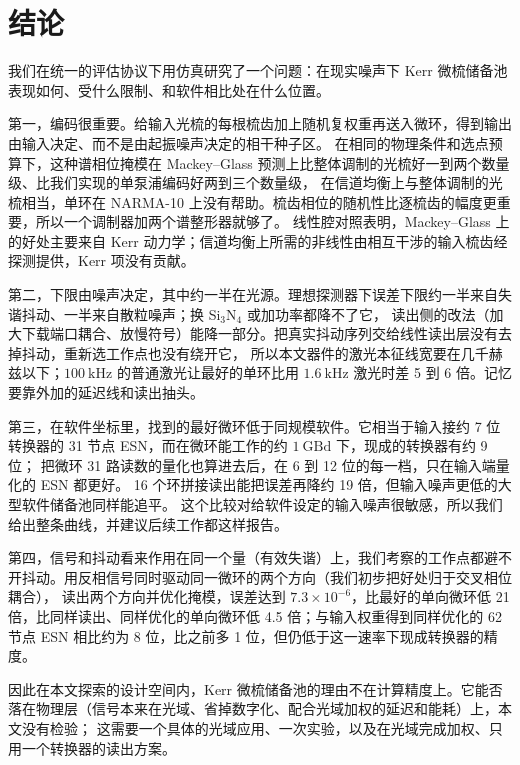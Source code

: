 \section{结论}\label{sec:conclusion}

我们在统一的评估协议下用仿真研究了一个问题：在现实噪声下 Kerr 微梳储备池表现如何、受什么限制、和软件相比处在什么位置。

第一，编码很重要。给输入光梳的每根梳齿加上随机复权重再送入微环，得到输出由输入决定、而不是由起振噪声决定的相干种子区。
在相同的物理条件和选点预算下，这种谱相位掩模在 Mackey--Glass 预测上比整体调制的光梳好一到两个数量级、比我们实现的单泵浦编码好两到三个数量级，
在信道均衡上与整体调制的光梳相当，单环在 NARMA-10 上没有帮助。梳齿相位的随机性比逐梳齿的幅度更重要，所以一个调制器加两个谱整形器就够了。
线性腔对照表明，Mackey--Glass 上的好处主要来自 Kerr 动力学；信道均衡上所需的非线性由相互干涉的输入梳齿经探测提供，Kerr 项没有贡献。

第二，下限由噪声决定，其中约一半在光源。理想探测器下误差下限约一半来自失谐抖动、一半来自散粒噪声；换 Si$_3$N$_4$ 或加功率都降不了它，
读出侧的改法（加大下载端口耦合、放慢符号）能降一部分。把真实抖动序列交给线性读出层没有去掉抖动，重新选工作点也没有绕开它，
所以本文器件的激光本征线宽要在几千赫兹以下；$100~\mathrm{kHz}$ 的普通激光让最好的单环比用 $1.6~\mathrm{kHz}$ 激光时差 5 到 6 倍。记忆要靠外加的延迟线和读出抽头。

第三，在软件坐标里，找到的最好微环低于同规模软件。它相当于输入接约 7 位转换器的 31 节点 ESN，而在微环能工作的约 $1~\mathrm{GBd}$ 下，现成的转换器有约 9 位；
把微环 31 路读数的量化也算进去后，在 6 到 12 位的每一档，只在输入端量化的 ESN 都更好。
16 个环拼接读出能把误差再降约 19 倍，但输入噪声更低的大型软件储备池同样能追平。
这个比较对给软件设定的输入噪声很敏感，所以我们给出整条曲线，并建议后续工作都这样报告。

第四，信号和抖动看来作用在同一个量（有效失谐）上，我们考察的工作点都避不开抖动。用反相信号同时驱动同一微环的两个方向（我们初步把好处归于交叉相位耦合），
读出两个方向并优化掩模，误差达到 $7.3\times10^{-6}$，比最好的单向微环低 21 倍，比同样读出、同样优化的单向微环低 4.5 倍；与输入权重得到同样优化的 62 节点 ESN 相比约为 8 位，比之前多 1 位，但仍低于这一速率下现成转换器的精度。

因此在本文探索的设计空间内，Kerr 微梳储备池的理由不在计算精度上。它能否落在物理层（信号本来在光域、省掉数字化、配合光域加权的延迟和能耗）上，本文没有检验；
这需要一个具体的光域应用、一次实验，以及在光域完成加权、只用一个转换器的读出方案。
